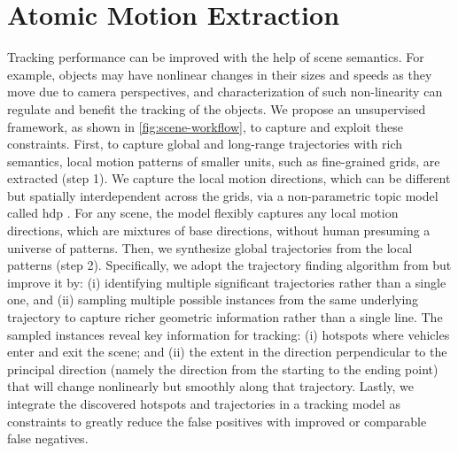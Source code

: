 \section{Atomic Motion Extraction}
\label{sec:scene-hdp}

Tracking performance can be improved with the help of scene semantics.
For example, objects may have nonlinear changes in their sizes and speeds as they move due to camera perspectives,
and characterization of such non-linearity can regulate and benefit the tracking of the objects.
We propose an unsupervised framework, as shown in \ref{fig:scene-workflow}, to capture and exploit these constraints.
First, to capture global and long-range trajectories
with rich semantics,
local motion patterns of smaller units, such as fine-grained grids, are extracted (step 1).
We capture the local motion directions, which can be different but spatially interdependent across the grids, via a non-parametric topic model called \gls{hdp} \cite{yee2006hierarchical,wang2009unsupervised}.
For any scene, the model flexibly captures any local motion directions,
which are mixtures of base directions, without human presuming a universe of patterns.
Then, we synthesize global trajectories from the local patterns (step 2).
Specifically,
we adopt the trajectory finding algorithm from \cite{wang2009unsupervised} but improve it by:
(i) identifying multiple significant trajectories rather than a single one, and
(ii) sampling multiple possible instances from the same underlying trajectory to capture richer geometric information rather than a single line.
The sampled instances reveal key information for tracking:
(i) 
hotspots where vehicles enter and exit the scene; and
(ii) the extent in the direction perpendicular to the principal direction
(namely the direction from the starting to the ending point)
that will change nonlinearly but smoothly along that trajectory.
Lastly, we integrate the discovered hotspots and trajectories
in a tracking model as constraints to greatly reduce the false positives with improved or comparable false negatives.

